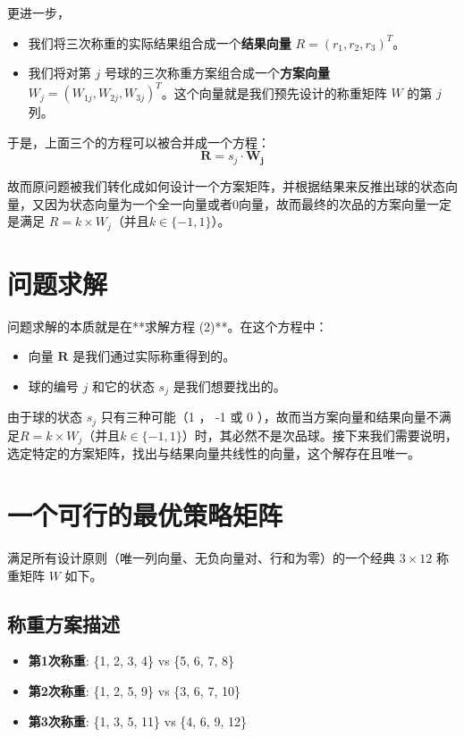 \documentclass[12pt, a4paper]{ctexart}
\begin{document}
更进一步，
\begin{itemize}
    \item 我们将三次称重的实际结果组合成一个\textbf{结果向量} $R = (r_1, r_2, r_3)^T$。
    \item 我们将对第 $j$ 号球的三次称重方案组合成一个\textbf{方案向量} $W_j = (W_{1j}, W_{2j}, W_{3j})^T$。这个向量就是我们预先设计的称重矩阵 $W$ 的第 $j$ 列。
\end{itemize}
于是，上面三个的方程可以被合并成一个方程：
\begin{equation}
    \mathbf{R} = s_j \cdot \mathbf{W_j}
\end{equation}

故而原问题被我们转化成如何设计一个方案矩阵，并根据结果来反推出球的状态向量，又因为状态向量为一个全一向量或者0向量，故而最终的次品的方案向量一定是满足
$R = k \times W_j$（并且$k \in \{-1, 1\}$）。
\section{问题求解}

问题求解的本质就是在**求解方程 (2)**。在这个方程中：
\begin{itemize}
    \item 向量 $\mathbf{R}$ 是我们通过实际称重得到的。
    \item 球的编号 $j$ 和它的状态 $s_j$ 是我们想要找出的。
\end{itemize}
由于球的状态 $s_j$ 只有三种可能（1 ， -1 或 0 ），故而当方案向量和结果向量不满足$R = k \times W_j$（并且$k \in \{-1, 1\}$）时，其必然不是次品球。接下来我们需要说明，选定特定的方案矩阵，找出与结果向量共线性的向量，这个解存在且唯一。



\section*{一个可行的最优策略矩阵}

满足所有设计原则（唯一列向量、无负向量对、行和为零）的一个经典 $3 \times 12$ 称重矩阵 $W$ 如下。

\subsection*{称重方案描述}
\begin{itemize}
    \item \textbf{第1次称重}: \{1, 2, 3, 4\} vs \{5, 6, 7, 8\}
    \item \textbf{第2次称重}: \{1, 2, 5, 9\} vs \{3, 6, 7, 10\}
    \item \textbf{第3次称重}: \{1, 3, 5, 11\} vs \{4, 6, 9, 12\}
\end{itemize}
\end{document}
